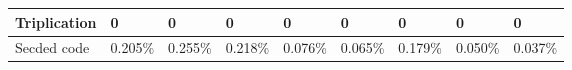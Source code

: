 \begin{table}
\begin{tabular}{lllllllll}
\hline
Triplication              & 0                                              & 0                                              & 0                                              & 0                                              & 0                                              & 0                                              & 0                                              & 0                                              \\
\hline
Secded code               & 0.205\%                                      & 0.255\%                                       & 0.218\%                                      & 0.076\%                                      & 0.065\%                                      & 0.179\%                                       & 0.050\%                                      & 0.037\% \\
\hline
\end{tabular}
\end{table}

